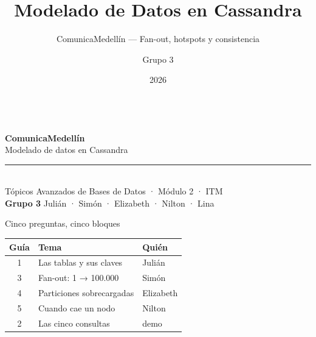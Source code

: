\documentclass[aspectratio=169,11pt]{beamer}
\title{\textbf{Modelado de Datos en Cassandra}}
\subtitle{ComunicaMedellín — Fan-out, hotspots y consistencia}
\author{Grupo 3}
\institute{Tópicos Avanzados de Bases de Datos · Módulo 2 · ITM}
\date{2026}
\begin{document}
\begin{frame}[plain]
\vfill
\centering
{\logomarca[3.2]}\\[14pt]
{\Huge\textcolor{cmAzul}{\textbf{Comunica}}\textcolor{cmVerde}{\textbf{Medellín}}}\\[8pt]
{\large\textcolor{cmGris}{Modelado de datos en Cassandra}}\\[20pt]
\rule{0.35\textwidth}{0.4pt}\\[12pt]
{\footnotesize\textcolor{cmGris}{Tópicos Avanzados de Bases de Datos · Módulo 2 · ITM}}\\[6pt]
{\footnotesize\textbf{Grupo 3} \quad
 \textcolor{cmGris}{Julián · Simón · Elizabeth · Nilton · Lina}}
\vfill
\end{frame}

\begin{frame}{Cinco preguntas, cinco bloques}
\vspace{6pt}
\centering
\small
\begin{tabular}{@{}clp{2.4cm}@{}}
\toprule
\textbf{Guía} & \textbf{Tema} & \textbf{Quién} \\
\midrule
1 & Las tablas y sus claves & Julián \\
3 & Fan-out: 1 → 100.000 & Simón \\
4 & Particiones sobrecargadas & Elizabeth \\
5 & Cuando cae un nodo & Nilton \\
2 & Las cinco consultas & \textcolor{cmVerde}{demo} \\
\bottomrule
\end{tabular}

\end{frame}
\end{document}
